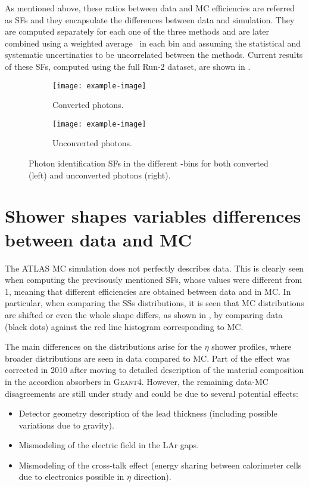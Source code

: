 As mentioned above, these ratios between data and \ac{MC} efficiencies are referred as \acfp{SF} and they encapsulate the differences between data and simulation. They are computed separately for each one of the three methods and are later combined using a weighted average~\cite{BLUEMethod} in each bin and assuming the statistical and systematic uncertinaties to be uncorrelated between the methods. Current results of these \acp{SF}, computed using the full Run-2 dataset, are shown in \Fig{\ref{fig:pid_ss:pid:efficiencies:sfs}}.

\begin{figure}[ht!]
    \centering
    \begin{subfigure}[h]{0.49\linewidth}
        \centering
        \texttt{[image: example-image]}
        \caption{Converted photons.}
    \end{subfigure}
    \hfill
    \begin{subfigure}[h]{0.49\linewidth}
        \centering
        \texttt{[image: example-image]}
        \caption{Unconverted photons.}
    \end{subfigure}
    \caption{Photon identification \acp{SF} in the different \pt-\abseta bins for both converted (left) and unconverted photons (right). }
    \label{fig:pid_ss:pid:efficiencies:sfs}
\end{figure}


\section{Shower shapes variables differences between data and MC}
\label{sec:pid_ss:ss_differences}


The \ac{ATLAS} \ac{MC} simulation does not perfectly describes data. This is clearly seen when computing the previsously mentioned \acp{SF}, whose values were different from 1, meaning that different efficiencies are obtained between data and in \ac{MC}. In particular, when comparing the \acp{SS} distributions, it is seen that \ac{MC} distributions are shifted or even the whole shape differs, as shown in \Fig{\ref{fig:pid_ss:ss_differences:ss}}, by comparing data (black dots) against the red line histogram corresponding to \ac{MC}.

The main differences on the distributions arise for the \(\eta\) shower profiles, where broader distributions are seen in data compared to \ac{MC}. Part of the effect was corrected in 2010 after moving to detailed description of the material composition in the accordion absorbers in \textsc{Geant4}. However, the remaining data-\ac{MC} disagreements are still under study and could be due to several potential effects:
\begin{itemize}
    \item Detector geometry description of the lead thickness (including possible variations due to gravity).
    \item Mismodeling of the electric field in the \ac{LAr} gaps.
    \item Mismodeling of the cross-talk effect (energy sharing between calorimeter cells due to electronics possible in \(\eta\) direction).
\end{itemize}

